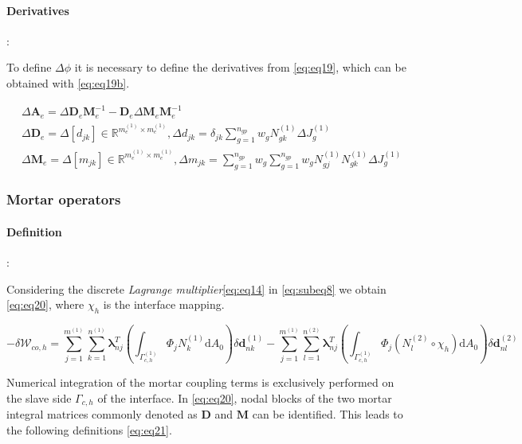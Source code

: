 \documentclass[a4paper,10pt]{article} %
\begin{document}
\paragraph{Derivatives}:

To define $\Delta \phi$ it is necessary to define the derivatives from \eqref{eq:eq19}, which can be obtained with \eqref{eq:eq19b}.

\begin{equation}\label{eq:eq19b}
\begin{aligned}
 & \Delta \mathbf{A}_e = \Delta \mathbf{D}_e\mathbf{M}_e^{-1} - \mathbf{D}_e\Delta\mathbf{M}_e\mathbf{M}_e^{-1} \\
 &\Delta \mathbf{D}_e = \Delta[d_{jk}] \in \mathbb{R}^{m_e^{(1)} \times m_e^{(1)}}, \Delta d_{jk} = \delta_{jk} \sum_{g = 1}^{n_{gp}} w_g N_{gk}^{(1)} \Delta J_g^{(1)}  \\
 & \Delta \mathbf{M}_e = \Delta[m_{jk}] \in \mathbb{R}^{m_e^{(1)} \times m_e^{(1)}}, \Delta m_{jk} = \sum_{g = 1}^{n_{gp}} w_g  \sum_{g = 1}^{n_{gp}} w_g  N_{gj}^{(1)} N_{gk}^{(1)} \Delta J_g^{(1)}
\end{aligned}
 \end{equation}
 
\subsubsection{Mortar operators}

\paragraph{Definition}:

Considering the discrete \textit{Lagrange multiplier}\eqref{eq:eq14} in \eqref{eq:subeq8} we obtain \eqref{eq:eq20}, where $\chi_h$ is the interface mapping.

\begin{equation}\label{eq:eq20}
 -\delta \mathcal{W}_{co,h} = \sum_{j=1}^{m^{(1)}}\sum_{k=1}^{n^{(1)}} \boldsymbol{\lambda}_{nj}^T \left(\int_{\Gamma_{c,h}^{(1)}} \Phi_j N_k^{(1)} \text{d}A_0 \right) \delta \mathbf{d}_{nk}^{(1)} -\sum_{j=1}^{m^{(1)}}\sum_{l=1}^{n^{(2)}} \boldsymbol{\lambda}_{nj}^T \left(\int_{\Gamma_{c,h}^{(1)}} \Phi_j \left(N_l^{(2)} \circ \chi_h\right) \text{d}A_0 \right) \delta \mathbf{d}_{nl}^{(2)}
\end{equation}

Numerical integration of the mortar coupling terms is exclusively performed on the slave side $\Gamma_{c,h}$ of the interface. In \eqref{eq:eq20}, nodal blocks of the two mortar integral matrices commonly denoted as $\mathbf{D}$ and $\mathbf{M}$ can be identified. This leads to the following definitions \eqref{eq:eq21}.
\end{document}
